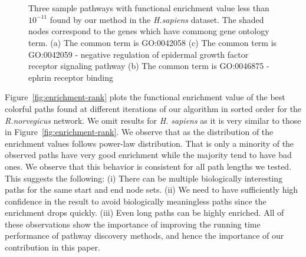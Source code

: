 \documentclass{ws-procs11x85}
\begin{document}
\begin{figure}
  \centering
   \\


 \\


\caption{Three sample pathways with functional enrichment value less
  than $10^{-11}$ found by our method in the {\it H.sapiens} dataset. The shaded nodes correspond
  to the genes which have commong gene ontology term.  (a) The common
  term is GO:0042058 (c) The common term is GO:0042059 - negative
  regulation of epidermal growth factor receptor signaling pathway (b)
  The common term is GO:0046875 - ephrin receptor binding }
\label{fig:paths}
\end{figure}


Figure~\ref{fig:enrichment-rank} plots the functional enrichment value
of the best colorful paths found at different iterations of our
algorithm in sorted order for the {\it R.norvegicus} network. We omit
results for {\it H. sapiens} as it is very similar to those in
Figure~\ref{fig:enrichment-rank}.  We observe that as the distribution
of the enrichment values follows power-law distribution. That is only
a minority of the observed paths have very good enrichment while the
majority tend to have bad ones. We observe that this behavior is
consistent for all path lengths we tested. This suggests the
following: (i) There can be multiple biologically interesting paths
for the same start and end node sets.  (ii) We need to have
sufficiently high confidence in the result to avoid biologically
meaningless paths since the enrichment drops quickly.  (iii) Even long
paths can be highly enriched. All of these observations show the
importance of improving the running time performance of pathway
discovery methods, and hence the importance of our contribution in
this paper.
\end{document}
